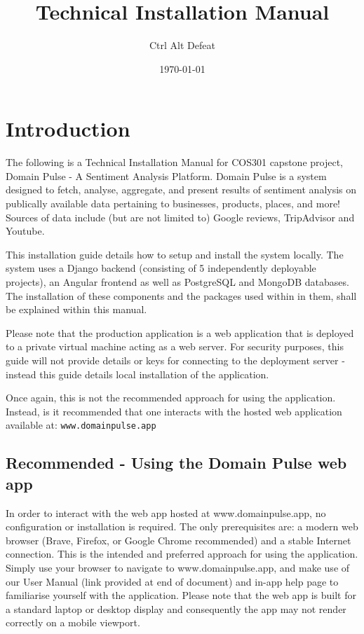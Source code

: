 \documentclass[12pt]{article}
\title{Technical Installation Manual}
\author{Ctrl Alt Defeat}
\date{\today}
\begin{document}
\maketitle

\tableofcontents


\section{Introduction}
The following is a Technical Installation Manual for COS301 capstone project, Domain Pulse - A Sentiment Analysis Platform. Domain Pulse is
a system designed to fetch, analyse, aggregate, and present results of sentiment analysis on publically available data pertaining to
businesses, products, places, and more! Sources of data include (but are not limited to) Google reviews, TripAdvisor and Youtube.

This installation guide details how to setup and install the system locally. The system uses a Django backend (consisting of 5 independently deployable projects),
an Angular frontend as well as PostgreSQL and MongoDB databases. The installation of these components and the packages used within in
them, shall be explained within this manual.

Please note that the production application is a web application that is deployed to a private virtual machine acting as a web server. For
security purposes, this guide will not provide details or keys for connecting to the deployment server - instead this guide details local installation
of the application.

Once again, this is not the recommended approach for using the application. Instead, is it recommended that one interacts with the hosted web
application available at: \texttt{www.domainpulse.app}

\subsection{Recommended - Using the Domain Pulse web app}
In order to interact with the web app hosted at www.domainpulse.app, no configuration or installation is required. The only
prerequisites are: a modern web browser (Brave, Firefox, or Google Chrome recommended) and a stable Internet connection. This is the
intended and preferred approach for using the application. Simply use your browser to navigate to www.domainpulse.app, and make use of
our User Manual (link provided at end of document) and in-app help page to familiarise yourself with the application. Please note that
the web app is built for a standard laptop or desktop display and consequently the app may not render correctly on a mobile viewport.
\end{document}
